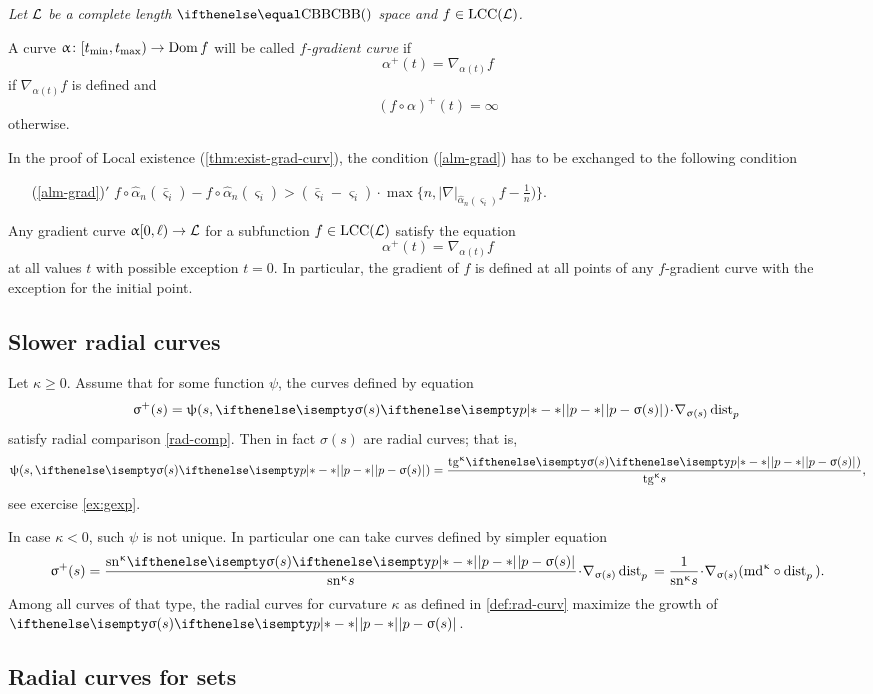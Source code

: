{\it Let $\mathcal{L}$ be a complete length $\Alex{}$ space
and $f\in\LSCSC(\spc{L})$.

A curve 
$\alpha\:[t_{\min},t_{\max})\to\Dom f$ will be called \emph{$f$-gradient curve} if
\[\alpha^+(t)=\nabla_{\alpha(t)} f\]
if $\nabla_{\alpha(t)} f$ is defined and 
\[(f\circ\alpha)^+(t)=\infty\]
otherwise.}

\medskip

In the proof of Local existence (\ref{thm:exist-grad-curv}), the condition (\ref{alm-grad})
has to be exchanged to the following condition
\begin{itemize}

\item[{(\ref{alm-grad})}$'$]
$f\circ\hat\alpha_n(\bar\varsigma_i)-f\circ\hat\alpha_n(\varsigma_i)
>
(\bar\varsigma_i-\varsigma_i)
\cdot
\max\{n,|\nabla|_{\hat\alpha_n(\varsigma_i)}f-\tfrac{1}{n})\}.$
\end{itemize}

Any gradient curve $\alpha[0,\ell)\to\spc{L}$
for a subfunction
$f\in \LSCSC(\spc{L})$
satisfy the equation
\[\alpha^+(t)=\nabla_{\alpha(t)} f\]
at all values $t$ with possible exception $t=0$.
In particular, the gradient of $f$ is defined at all points of any 
$f$-gradient curve with the exception for the initial point.

\subsection*{Slower radial curves}
Let $\kappa\ge 0$. 
Assume that for some function $\psi$, the curves defined by equation 
\[\sigma^+(s)=\psi(s,\dist{p}{\sigma(s)}{})\cdot\nabla_{\sigma(s)}\distfun{p}{}{}\]
satisfy radial comparison \ref{rad-comp}.
Then in fact $\sigma(s)$ are radial curves; 
that is, 
\[\psi(s,\dist{p}{\sigma(s)}{})= \frac{\tg\kappa\dist[{{}}]{p}{\sigma(s)}{})}{\tg\kappa s},\]
see exercise \ref{ex:gexp}.

In case $\kappa<0$, such $\psi$ is not unique.
In particular one can take curves defined by simpler equation
\[\sigma^+(s)
=
\frac{\sn\kappa \dist[{{}}]{p}{\sigma(s)}{}}{\sn\kappa s}\cdot\nabla_{\sigma(s)}\distfun{p}{}{}
=
\frac{1}{\sn\kappa s}\cdot\nabla_{\sigma(s)}(\md\kappa\circ\distfun{p}{}{}).\]
Among all curves of that type, the radial curves for curvature $\kappa$ 
as defined in \ref{def:rad-curv} maximize the growth of $\dist{p}{\sigma(s)}{}$.

\subsection*{Radial curves for sets}

